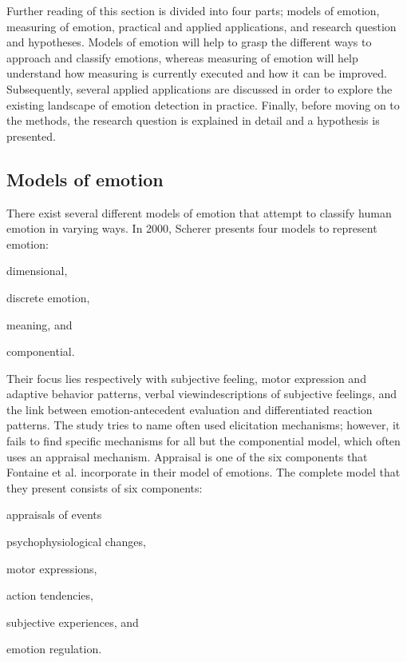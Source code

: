 \documentclass{sigchi}
\begin{document}
Further reading of this section is divided into four parts; models of emotion, measuring of emotion, practical and applied applications, and research question and hypotheses. Models of emotion will help to grasp the different ways to approach and classify emotions, whereas measuring of emotion will help understand how measuring is currently executed and how it can be improved. Subsequently, several applied applications are discussed in order to explore the existing landscape of emotion detection in practice. Finally, before moving on to the methods, the research question is explained in detail and a hypothesis is presented.

\subsection{Models of emotion} %
\label{sub:models_of_emotion}
There exist several different models of emotion that attempt to classify human emotion in varying ways. In 2000, Scherer \cite{scherer2000} presents four models to represent emotion:
\begin{enumerate*}[label=(\alph*)]
  \item dimensional,
  \item discrete emotion,
  \item meaning, and
  \item componential.
\end{enumerate*}
Their focus lies respectively with subjective feeling, motor expression and adaptive behavior patterns, verbal viewindescriptions of subjective feelings, and the link between emotion-antecedent evaluation and differentiated reaction patterns. The study tries to name often used elicitation mechanisms; however, it fails to find specific mechanisms for all but the componential model, which often uses an appraisal mechanism. Appraisal is one of the six components that Fontaine et al. \cite{Fontaine2007} incorporate in their model of emotions. The complete model that they present consists of six components:
\begin{enumerate*}[label=(\alph*)]
  \item appraisals of events
  \item psychophysiological changes,
  \item motor expressions,
  \item action tendencies,
  \item subjective experiences, and
  \item emotion regulation.
\end{enumerate*}
\end{document}
